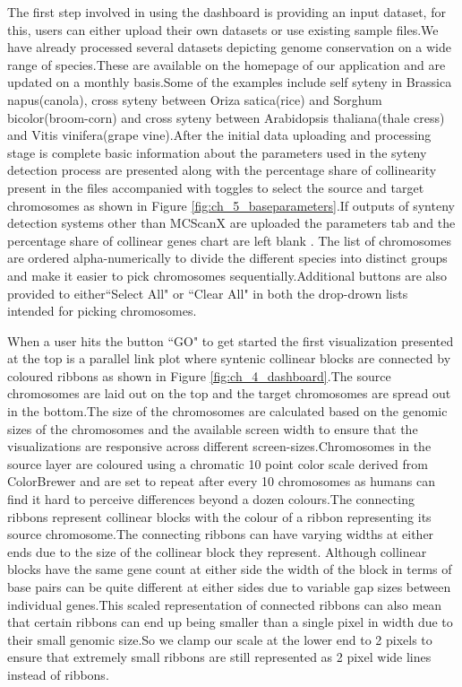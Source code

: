 The first step involved in using the dashboard is providing an input dataset, for this, users can either upload their own datasets or use existing sample files.We have already processed several datasets depicting genome conservation on a wide range of species.These are available on the homepage of our application and are updated on a monthly basis.Some of the examples include self syteny in Brassica napus(canola), cross syteny between Oriza satica(rice) and Sorghum bicolor(broom-corn) and cross syteny between Arabidopsis thaliana(thale cress) and Vitis vinifera(grape vine).After the initial data uploading and processing stage is complete basic information about the parameters used in the syteny detection process are presented along with the percentage share of collinearity present in the files accompanied with toggles to select the source and target chromosomes as shown in Figure \ref{fig:ch_5_baseparameters}.If outputs of synteny detection systems other than MCScanX are uploaded the parameters tab and the percentage share of collinear genes chart are left blank . The list of chromosomes are ordered alpha-numerically to divide the different species into distinct groups and make it easier to pick chromosomes sequentially.Additional buttons are also provided to either``Select All" or ``Clear All" in both the drop-drown lists intended for picking chromosomes.


When a user hits the button ``GO" to get started the first visualization presented at the top is a parallel link plot where syntenic collinear blocks are connected by coloured ribbons as shown in Figure \ref{fig:ch_4_dashboard}.The source chromosomes are laid out on the top and the target chromosomes are spread out in the bottom.The size of the chromosomes are calculated based on the genomic sizes of the chromosomes and the available screen width to ensure that the visualizations are responsive across different screen-sizes.Chromosomes in the source layer are coloured using a chromatic 10 point color scale derived from ColorBrewer\cite{colorbrewer} and are set to repeat after every 10 chromosomes as humans can find it hard to perceive differences beyond a dozen colours\cite{ware2012information}.The connecting ribbons represent collinear blocks with the colour of a ribbon representing its source chromosome.The connecting ribbons can have varying widths at either ends due to the size of the collinear block they represent. Although collinear blocks have the same gene count at either side the width of the block in terms of base pairs can be quite different at either sides due to variable gap sizes between individual genes.This scaled representation of connected ribbons can also mean that certain ribbons can end up being smaller than a single pixel in width due to their small genomic size.So we clamp our scale at the lower end to 2 pixels to ensure that extremely small ribbons are still represented as 2 pixel wide lines instead of ribbons.

